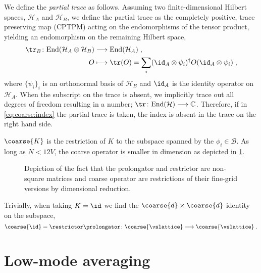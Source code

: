 We define the \emph{partial trace} as follows.
Assuming two finite-dimensional Hilbert spaces, $\mathcal{H}_A$ and $\mathcal{H}_B$, we define the partial trace as the completely positive, trace preserving map (CPTPM) acting on the endomorphisms of the tensor product, yielding an endomorphism on the remaining Hilbert space,
\begin{align} \label{eq:partial:trace}
\begin{aligned}
\tr_B \colon \text{End}(\mathcal{H}_A \otimes \mathcal{H}_B) &\longrightarrow \text{End}(\mathcal{H}_A) \;, \\
O &\longmapsto \tr(O) = \sum_{i} ( \id_A \otimes \psi_i )^{\dagger} O ( \id_A \otimes \psi_i ) \;,
\end{aligned}
\end{align}
where $\{\psi_i\}_i$ is an orthonormal basis of $\mathcal{H}_B$ and $\id_A$ is the identity operator on $\mathcal{H}_A$.
When the subscript on the trace is absent, we implicitly trace out all degrees of freedom resulting in a number; $\tr \colon \text{End}(\mathcal{H}) \longrightarrow \mathbb{C}$.
Therefore, if in \cref{eq:coarse:index} the partial trace is taken, the index is absent in the trace on the right hand side.

$\coarse{K}$ is the restriction of $K$ to the subspace spanned by the $\phi_{i} \in \mathcal{B}$.
As long as $N < 12V$, the coarse operator is smaller in dimension as depicted in \cref{fig:coarsen}.
\begin{figure}
  
  \caption{Depiction of the fact that the prolongator and restrictor are non-square matrices and coarse operator are restrictions of their fine-grid versions by dimensional reduction.}
  \label{fig:coarsen}
\end{figure}
Trivially, when taking $K = \id$ we find the $\coarse{d} \times \coarse{d}$ identity on the subspace,
\begin{equation}
\coarse{\id} = \restrictor \prolongator \colon \coarse{\vslattice} \longrightarrow \coarse{\vslattice} \;.
\end{equation}

\section{Low-mode averaging}
\label{sec:sd:lma}

